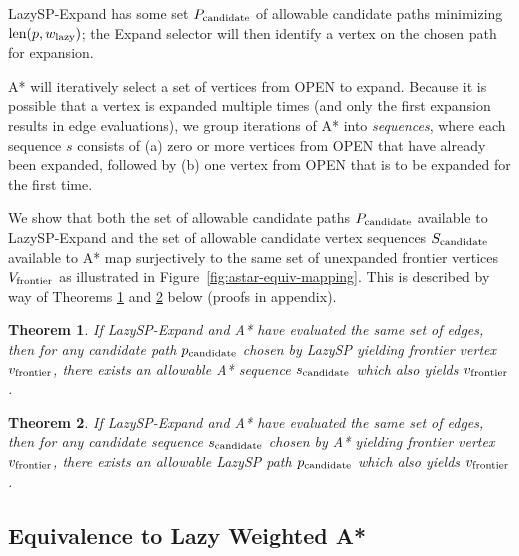 \documentclass[nobib]{tufte-book}
\newcommand{\ms}[1]{\mbox{\scriptsize #1}}
\newtheorem{theorem}{Theorem}
\begin{document}
LazySP-Expand has some set $P_{\ms{candidate}}$ of allowable
candidate paths minimizing $\mbox{len}(p,w_{\ms{lazy}})$;
the Expand selector will then identify a vertex on the chosen path
for expansion.

A* will iteratively select a set of vertices from OPEN to expand.
Because it is possible that a vertex is expanded multiple times
(and only the first expansion results in edge evaluations),
we group iterations of A* into \emph{sequences},
where each sequence $s$ consists of
(a) zero or more vertices from OPEN that have already been expanded,
followed by (b) one vertex from OPEN that is to be expanded
for the first time.

We show that both the set of allowable candidate paths $P_{\ms{candidate}}$
available to LazySP-Expand
and the set of allowable candidate vertex sequences $S_{\ms{candidate}}$
available to A*
map surjectively to the same set of unexpanded frontier vertices $V_{\ms{frontier}}$
as illustrated in Figure~\ref{fig:astar-equiv-mapping}.
This is described by way of
Theorems \ref{thm:astar-equiv-from-lazy}
and \ref{thm:astar-equiv-to-lazy} below
(proofs in appendix).

\begin{theorem}
If LazySP-Expand and A* have evaluated the same set of edges,
then for any candidate path $p_{\ms{candidate}}$ chosen by LazySP
yielding frontier vertex $v_{\ms{frontier}}$,
there exists an allowable A* sequence $s_{\ms{candidate}}$
which also yields $v_{\ms{frontier}}$.
\label{thm:astar-equiv-from-lazy}
\end{theorem}

\begin{theorem}
If LazySP-Expand and A* have evaluated the same set of edges,
then for any candidate sequence $s_{\ms{candidate}}$ chosen by A*
yielding frontier vertex $v_{\ms{frontier}}$,
there exists an allowable LazySP path $p_{\ms{candidate}}$
which also yields $v_{\ms{frontier}}$.
\label{thm:astar-equiv-to-lazy}
\end{theorem}

\subsection{Equivalence to Lazy Weighted A*}

\end{document}
